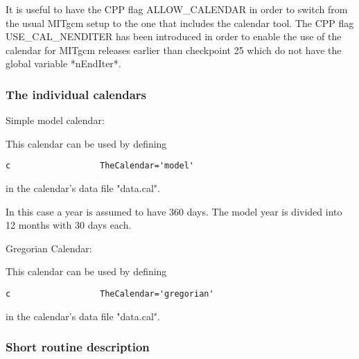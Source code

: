     It is useful to have the CPP flag ALLOW\_CALENDAR in
    order to switch from the usual MITgcm setup to the
    one that includes the calendar tool. The CPP flag
    USE\_CAL\_NENDITER has been introduced in order to enable
    the use of the calendar for MITgcm releases earlier
    than checkpoint 25 which do not have the global variable
    *nEndIter*.

\subsubsection{The individual calendars}

Simple model calendar:

          This calendar can be used by defining

\begin{verbatim}
c                  TheCalendar='model'
\end{verbatim}

          in the calendar's data file "data.cal".

          In this case a year is assumed to have 360 days. The
          model year is divided into 12 months with 30 days each.

Gregorian Calendar:

          This calendar can be used by defining

\begin{verbatim}
c                  TheCalendar='gregorian'
\end{verbatim}

          in the calendar's data file "data.cal".

\subsubsection{Short routine description}

